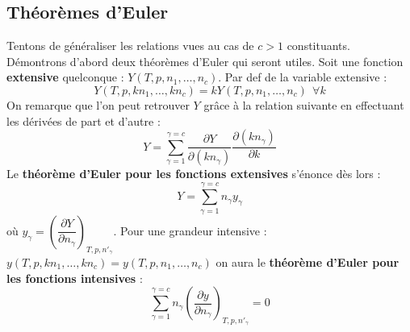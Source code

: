 \documentclass[british,french,11pt, a4paper, openany]{book}
\begin{document}
	\subsection{Théorèmes d'Euler}
	Tentons de généraliser les relations vues au cas de $c > 1$ constituants. Démontrons d'abord deux théorèmes d'Euler qui seront utiles. Soit  une fonction \textbf{extensive} quelconque : $Y(T, p, n_1, \dots, n_c)$. Par def de la variable extensive :
	\begin{equation}
	Y(T, p, kn_1, \dots, kn_c) = kY(T, p, n_1, \dots, n_c)\ \ \forall k
	\end{equation}
	On remarque que l'on peut retrouver $Y$ grâce à la relation suivante en effectuant les dérivées de part et d'autre :
	\begin{equation}
	Y = \sum_{\gamma = 1}^{\gamma = c} \frac{\partial Y}{\partial (kn_\gamma)}\frac{\partial (kn_\gamma)}{\partial k}
	\end{equation}
	Le \textbf{théorème d'Euler pour les fonctions extensives} s'énonce dès lors :
	\begin{equation}
	Y = \sum _{\gamma = 1}^{\gamma = c} n_\gamma y_\gamma
	\end{equation}
	où $y_\gamma = \left(\dfrac{\partial Y}{\partial n_\gamma}\right)_{T,p,n'_\gamma}$. Pour une grandeur intensive : $y(T, p, kn_1,\dots, kn_c) = y(T, p,n_1,\dots, n_c)$ on aura le \textbf{théorème d'Euler pour les fonctions intensives} :
	\begin{equation}
	\sum_{\gamma = 1}^{\gamma = c} n_\gamma\left(\dfrac{\partial y}{\partial n_\gamma}\right)_{T, p, n'_\gamma} = 0
	\end{equation}
\end{document}
